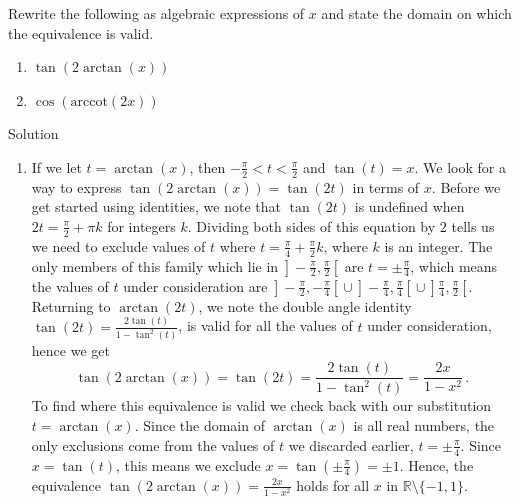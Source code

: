 \begin{example}
 Rewrite the following as algebraic expressions of $x$ and state the domain on which the equivalence is valid.

\begin{multicols}{2}

\begin{enumerate}

\item  $\tan(2 \arctan(x))$

\item  $\cos(\mbox{arccot}(2x))$ 

\end{enumerate}

\end{multicols}

Solution 

\begin{enumerate}

\item If we let $t = \arctan(x)$, then $-\frac{\pi}{2} < t < \frac{\pi}{2}$ and $\tan(t) = x$.   We look for a way to express $\tan(2 \arctan(x)) = \tan(2t)$ in terms of $x$.  Before we get started using identities, we note that $\tan(2t)$ is undefined when $2t = \frac{\pi}{2} + \pi k$ for integers $k$.  Dividing both sides of this equation by $2$ tells us we need to exclude values of $t$ where $t = \frac{\pi}{4} + \frac{\pi}{2} k$, where $k$ is an integer.  The only members of this family which lie in $\left.\right]-\frac{\pi}{2}, \frac{\pi}{2}\left[\right.$ are $t = \pm \frac{\pi}{4}$, which means the values of $t$ under consideration are $\left.\right]-\frac{\pi}{2}, -\frac{\pi}{4}\left[\right. \cup \left.\right]-\frac{\pi}{4}, \frac{\pi}{4}\left[\right. \cup \left.\right]\frac{\pi}{4}, \frac{\pi}{2}\left[\right.$.  Returning to $\arctan(2t)$, we note the double angle identity $\tan(2t) = \frac{2 \tan(t)}{1 - \tan^{2}(t)}$, is valid for all the values of $t$ under consideration, hence we get 
$$
\tan(2 \arctan(x)) = \tan(2t) = \frac{2 \tan(t)}{1 - \tan^{2}(t)}= \frac{2x}{1-x^2}\,.
$$
To find where this equivalence is valid we check back with our substitution $t = \arctan(x)$. Since the domain of $\arctan(x)$ is all real numbers, the only exclusions come from the values of $t$ we discarded earlier, $t = \pm \frac{\pi}{4}$.   Since $x =\tan(t)$, this means we exclude $x = \tan\left(\pm \frac{\pi}{4}\right) = \pm 1$.  Hence, the equivalence  $\tan(2 \arctan(x)) =  \frac{2x}{1-x^2}$ holds for all $x$ in $\mathbb{R}\setminus\{-1,1\}$.


\end{enumerate}
\end{example}
